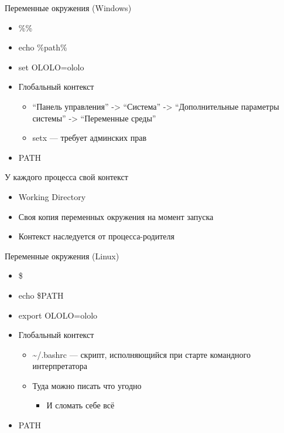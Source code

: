 \documentclass{../../slides-style}
\begin{document}
    \begin{frame}{Переменные окружения (Windows)}
        \begin{itemize}
            \item \%<имя переменной>\%
            \item echo \%path\%
            \item set OLOLO=ololo
            \item Глобальный контекст
            \begin{itemize}
                \item \enquote{Панель управления} -> \enquote{Система} -> \enquote{Дополнительные параметры системы} -> \enquote{Переменные среды}
                \item setx --- требует админских прав
            \end{itemize}
            \item PATH
        \end{itemize}

        У каждого процесса свой контекст
        \begin{itemize}
            \item Working Directory
            \item Своя копия переменных окружения на момент запуска
            \item Контекст наследуется от процесса-родителя
        \end{itemize}
    \end{frame}

    \begin{frame}{Переменные окружения (Linux)}
        \begin{itemize}
            \item \$<имя переменной>
            \item echo \$PATH
            \item export OLOLO=ololo
            \item Глобальный контекст
            \begin{itemize}
                \item \textasciitilde/.bashrc --- скрипт, исполняющийся при старте командного интерпретатора
                \item Туда можно писать что угодно
                \begin{itemize}
                    \item И сломать себе всё
                \end{itemize}
            \end{itemize}
            \item PATH
        \end{itemize}
    \end{frame}
\end{document}
